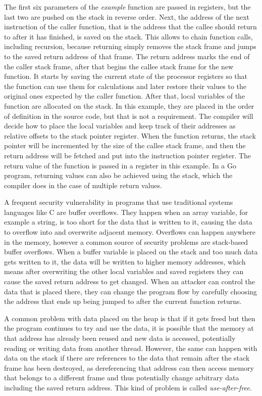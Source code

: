 The first six parameters of the \textit{example} function are passed in registers, but the last two are pushed on the
stack in reverse order.
Next, the address of the next instruction of the caller function, that is the address that the callee should return
to after it has finished, is saved on the stack.
This allows to chain function calls, including recursion, because returning simply removes the stack frame and jumps
to the saved return address of that frame.
The return address marks the end of the caller stack frame, after that begins the callee stack frame for the new
function.
It starts by saving the current state of the processor registers so that the function can use them for calculations and
later restore their values to the original ones expected by the caller function.
After that, local variables of the function are allocated on the stack.
In this example, they are placed in the order of definition in the source code, but that is not a requirement.
The compiler will decide how to place the local variables and keep track of their addresses as relative offsets to the
stack pointer register.
When the function returns, the stack pointer will be incremented by the size of the callee stack frame, and then the
return address will be fetched and put into the instruction pointer register.
The return value of the function is passed in a register in this example.
In a Go program, returning values can also be achieved using the stack, which the compiler does in the case of multiple
return values.



A frequent security vulnerability in programs that use traditional systems languages like C are buffer overflows.
They happen when an array variable, for example a string, is too short for the data that is written to it, causing the
data to overflow into and overwrite adjacent memory.
Overflows can happen anywhere in the memory, however a common source of security problems are stack-based buffer
overflows.
When a buffer variable is placed on the stack and too much data gets written to it, the data will be written to higher
memory addresses, which means after overwriting the other local variables and saved registers they can cause the saved
return address to get changed.
When an attacker can control the data that is placed there, they can change the program flow by carefully choosing the
address that ends up being jumped to after the current function returns.

A common problem with data placed on the heap is that if it gets freed but then the program continues to try and use the
data, it is possible that the memory at that address has already been reused and new data is accessed, potentially
reading or writing data from another thread.
However, the same can happen with data on the stack if there are references to the data that remain after the stack
frame has been destroyed, as dereferencing that address can then access memory that belongs to a different frame and
thus potentially change arbitrary data including the saved return address.
This kind of problem is called \textit{use-after-free}.

